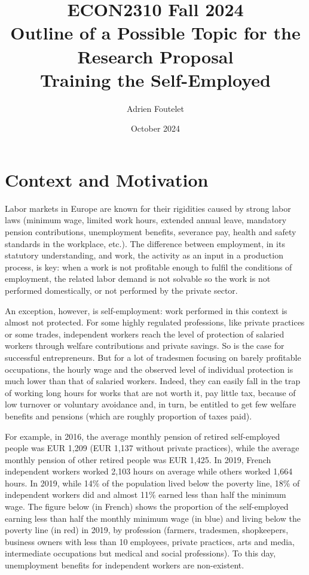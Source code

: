 \documentclass{article}
\title{ECON2310 Fall 2024\\Outline of a Possible Topic for the Research Proposal\\Training the Self-Employed}
\author{Adrien Foutelet}
\date{October 2024}
\begin{document}
\maketitle

\section{Context and Motivation}

Labor markets in Europe are known for their rigidities caused by strong labor laws (minimum wage, limited work hours, extended annual leave, mandatory pension contributions, unemployment benefits, severance pay, health and safety standards in the workplace, etc.). The difference between employment, in its statutory understanding, and work, the activity as an input in a production process, is key: when a work is not profitable enough to fulfil the conditions of employment, the related labor demand is not solvable so the work is not performed domestically, or not performed by the private sector.

An exception, however, is self-employment: work performed in this context is almost not protected. For some highly regulated professions, like private practices or some trades, independent workers reach the level of protection of salaried workers through welfare contributions and private savings. So is the case for successful entrepreneurs. But for a lot of tradesmen focusing on barely profitable occupations, the hourly wage and the observed level of individual protection is much lower than that of salaried workers. Indeed, they can easily fall in the trap of working long hours for works that are not worth it, pay little tax, because of low turnover or voluntary avoidance and, in turn, be entitled to get few welfare benefits and pensions (which are roughly proportion of taxes paid).

For example, in 2016, the average monthly pension of retired self-employed people was  EUR 1,209 (EUR 1,137 without private practices), while the average monthly pension of other retired people was EUR 1,425. In 2019, French independent workers worked 2,103 hours on average while others worked 1,664 hours. In 2019, while 14\% of the population lived below the poverty line, 18\% of independent workers did and almost 11\% earned less than half the minimum wage. The figure below (in French) shows the proportion of the self-employed earning less than half the monthly minimum wage (in blue) and living below the poverty line (in red) in 2019, by profession (farmers, tradesmen, shopkeepers, business owners with less than 10 employees, private practices, arts and media, intermediate occupations but medical and social professions). To this day, unemployment benefits for independent workers are non-existent. 
\end{document}
